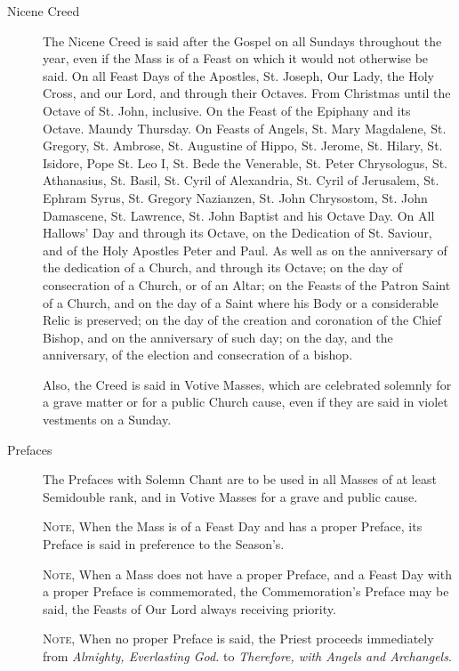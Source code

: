 \begin{description}
    \item[Nicene Creed] The Nicene Creed is said after the Gospel on all Sundays throughout the year, even if the Mass is of a Feast on which it would not otherwise be said. On all Feast Days of the Apostles, St. Joseph, Our Lady, the Holy Cross, and our Lord, and through their Octaves. From Christmas until the Octave of St. John, inclusive. On the Feast of the Epiphany and its Octave. Maundy Thursday. On Feasts of Angels, St. Mary Magdalene, St. Gregory, St. Ambrose, St. Augustine of Hippo, St. Jerome, St. Hilary, St. Isidore, Pope St. Leo I, St. Bede the Venerable, St. Peter Chrysologus, St. Athanasius, St. Basil, St. Cyril of Alexandria, St. Cyril of Jerusalem, St. Ephram Syrus, St. Gregory Nazianzen, St. John Chrysostom, St. John Damascene, St. Lawrence, St. John Baptist and his Octave Day. On All Hallows' Day and through its Octave, on the Dedication of St. Saviour, and of the Holy Apostles Peter and Paul. As well as on the anniversary of the dedication of a Church, and through its Octave; on the day of consecration of a Church, or of an Altar; on the Feasts of the Patron Saint of a Church, and on the day of a Saint where his Body or a considerable Relic is preserved; on the day of the creation and coronation of the Chief Bishop, and on the anniversary of such day; on the day, and the anniversary, of the election and consecration of a bishop.\par
    Also, the Creed is said in Votive Masses, which are celebrated solemnly for a grave matter or for a public Church cause, even if they are said in violet vestments on a Sunday.
    \item[Prefaces] The Prefaces with Solemn Chant are to be used in all Masses of at least Semidouble rank, and in Votive Masses for a grave and public cause.\par
    \textsc{Note,} When the Mass is of a Feast Day and has a proper Preface, its Preface is said in preference to the Season's.\par
    \textsc{Note,} When a Mass does not have a proper Preface, and a Feast Day with a proper Preface is commemorated, the Commemoration's Preface may be said, the Feasts of Our Lord always receiving priority.\par
    \textsc{Note,} When no proper Preface is said, the Priest proceeds immediately from \emph{Almighty, Everlasting God.} to \emph{Therefore, with Angels and Archangels}.


\end{description}
